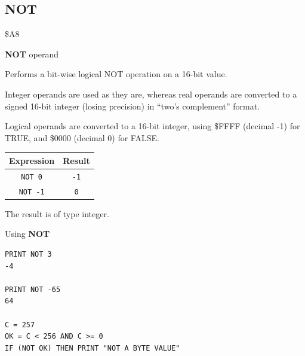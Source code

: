 
\newpage
\subsection{NOT}
\begin{description}[leftmargin=2cm,style=nextline]
\item [Token:]    \$A8

\item [Format:]   {\bf NOT} operand

\item [Usage:]    Performs a bit-wise logical NOT operation on a 16-bit value.

                  Integer operands are used as they are, whereas real operands are converted to a signed 16-bit integer (losing precision) in ``two's complement'' format.

                  Logical operands are converted to a 16-bit integer, using \$FFFF (decimal -1) for TRUE, and \$0000 (decimal 0) for FALSE.

                  \begin{center}
                  \setlength{\tabcolsep}{1mm}
                     \begin{tabular}{|c|c|}
                     \hline
                        {\bf Expression} & {\bf Result}  \\
                     \hline
                        \texttt{NOT 0}  &  \texttt{-1} \\
                        \texttt{NOT -1}  &  \texttt{0} \\
                     \hline
                  \end{tabular}
                  \end{center}

\item [Remarks:]  The result is of type integer.

\item [Examples:] Using {\bf NOT}

\begin{tcolorbox}[colback=black,coltext=white]
\verbatimfont{\codefont}
\begin{verbatim}
PRINT NOT 3
-4

PRINT NOT -65
64

C = 257
OK = C < 256 AND C >= 0
IF (NOT OK) THEN PRINT "NOT A BYTE VALUE"
\end{verbatim}
\end{tcolorbox}
\end{description}

